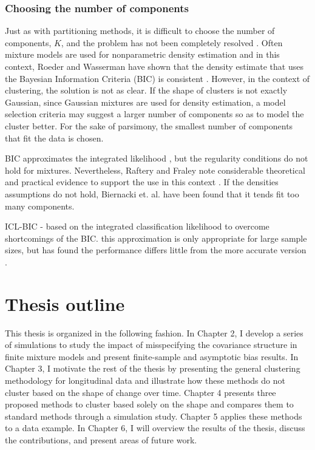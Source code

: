 

\subsubsection{Choosing the number of components}
Just as with partitioning methods, it is difficult to choose the number of components, $K$, and the problem has not been completely resolved \cite{mclachlan2000}. Often mixture models are used for nonparametric density estimation and in this context, Roeder and Wasserman have shown that the density estimate that uses the Bayesian Information Criteria (BIC) is consistent \cite{roeder1997}. However, in the context of clustering, the solution is not as clear. If the shape of clusters is not exactly Gaussian, since Gaussian mixtures are used for density estimation, a model selection criteria may suggest a larger number of components so as to model the cluster better. For the sake of parsimony, the smallest number of components that fit the data is chosen.

BIC approximates the integrated likelihood \cite{schwarz1978}, but the regularity conditions do not hold for mixtures. Nevertheless, Raftery and Fraley note considerable theoretical and practical evidence to support the use in this context \cite{fraley1998}. If the densities assumptions do not hold, Biernacki et. al. \cite{biernacki2000} have been found that it tends fit too many components. 

ICL-BIC - based on the integrated classification likelihood to overcome shortcomings of the BIC. this approximation is only appropriate for large sample sizes, but has found the performance differs little from the more accurate version \cite{biernacki2000}.

\section{Thesis outline}
This thesis is organized in the following fashion. In Chapter 2, I develop a series of simulations to study the impact of misspecifying the covariance structure in finite mixture models and present finite-sample and asymptotic bias results. In Chapter 3, I motivate the rest of the thesis by presenting the general clustering methodology for longitudinal data and illustrate how these methods do not cluster based on the shape of change over time. Chapter 4 presents three proposed methods to cluster based solely on the shape and compares them to standard methods through a simulation study. Chapter 5 applies these methods to a data example. In Chapter 6, I will overview the results of the thesis, discuss the contributions, and present areas of future work. 

